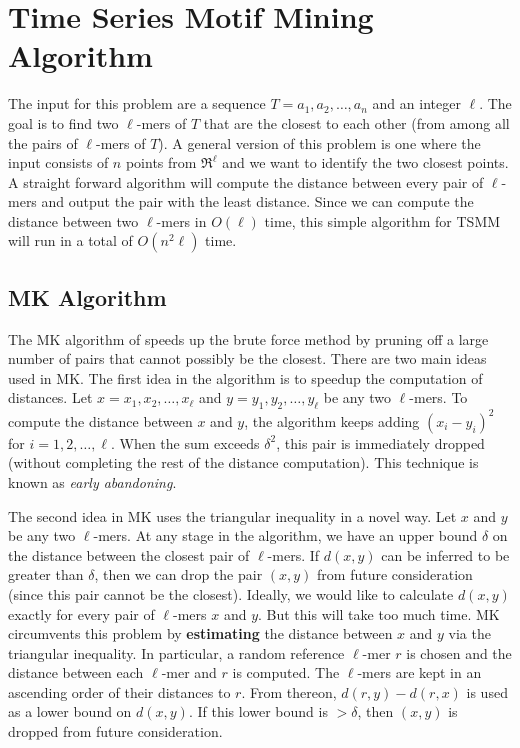 \documentclass{article}
\theoremstyle{definition}
\theoremstyle{remark}
\begin{document}
\section{Time Series Motif Mining Algorithm}\label{sec3}
The input for this problem are a sequence $T=a_1,a_2,\ldots,a_n$ and an integer $\ell$. The goal is to find two $\ell$-mers of $T$  that are the closest to each other (from among all the pairs of $\ell$-mers of $T$). A general version of this problem is one where the input consists of $n$ points from $\Re^\ell$ and we want to identify the two closest points.
A straight forward algorithm will compute the distance between every pair of $\ell$-mers and output the pair with the least distance. Since we can compute the distance between two $\ell$-mers in $O(\ell)$ time, this simple algorithm for TSMM will run in a total of $O(n^2\ell)$ time.

\subsection{MK Algorithm}
The MK algorithm of \cite{AEQSB09} speeds up the brute force method by pruning off a large number of pairs that cannot possibly be the closest. There are two main ideas used in MK.  The first idea in the algorithm is to speedup the computation of distances. Let $x=x_1,x_2,\ldots,x_\ell$ and $y=y_1,y_2,\ldots,y_\ell$ be any two $\ell$-mers. To compute the distance between $x$ and $y$, the algorithm keeps adding $(x_i-y_i)^2$ for $i=1,2,\ldots,\ell$. When the sum exceeds $\delta^2$, this pair is immediately dropped (without completing the rest of the distance computation). This technique is known as {\em early abandoning}.

The second idea in MK uses the triangular inequality in a novel way.
Let $x$ and $y$ be any two $\ell$-mers.  At any stage in the algorithm, we have an upper bound $\delta$ on the distance between the closest pair of $\ell$-mers. If $d(x,y)$ can be inferred to be greater than $\delta$, then we can drop the pair $(x,y)$ from future consideration (since this pair cannot be the closest). Ideally, we would like to calculate $d(x,y)$ exactly for every pair of $\ell$-mers $x$ and $y$. But this will take too much time. MK circumvents this problem by {\bf estimating} the distance between $x$ and $y$ via the triangular inequality. In particular, a random reference $\ell$-mer  $r$ is chosen and the distance between each $\ell$-mer and $r$ is computed.  The $\ell$-mers are kept in an ascending order of their distances to $r$. From thereon, $d(r,y)-d(r,x)$ is used as a lower bound on $d(x,y)$. If this lower bound is $>\delta$, then $(x,y)$ is dropped from future consideration.
\end{document}
